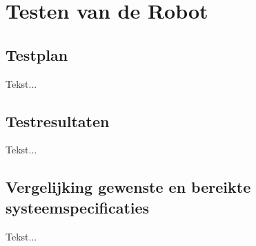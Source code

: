 \chapter[Testen van de Robot]{Testen van de Robot} \label {chapter:testen}

	\section{Testplan}
		Tekst...
	\section{Testresultaten}
		Tekst...
	\section{Vergelijking gewenste en bereikte systeemspecificaties}
		Tekst...
